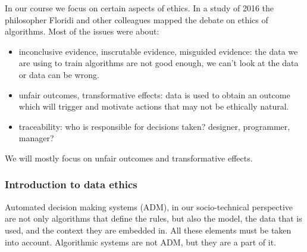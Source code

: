 In our course we focus on certain aspects of ethics. In a study of 2016 the philosopher Floridi and other colleagues mapped the debate on ethics of algorithms. Most of the issues were about:
\begin{itemize}
    \item inconclusive evidence, inscrutable evidence, misguided evidence: the data we are using to train algorithms are not good enough, we can't look at the data or data can be wrong. 
    \item unfair outcomes, transformative effects: data is used to obtain an outcome which will trigger and motivate actions that may not be ethically natural.
    \item traceability: who is responsible for decisions taken? designer, programmer, manager?
\end{itemize}
We will mostly focus on unfair outcomes and transformative effects.

\subsubsection{Introduction to data ethics}
Automated decision making systems (ADM), in our socio-technical perspective are not only algorithms that define the rules, but also the model, the data that is used, and the context they are embedded in. All these elements must be taken into account. Algorithmic systems are not ADM, but they are a part of it.

